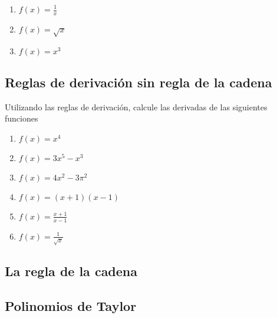 \begin{enumerate}
    \item $f(x) = \frac{1}{x}$
    \item $f(x) = \sqrt{x}$
    \item $f(x) = x^3$
\end{enumerate}

\subsection{Reglas de derivación sin regla de la cadena}

Utilizando las reglas de derivación, calcule las derivadas de las siguientes funciones
\begin{multicols}{2}
    \begin{enumerate}
        \item $f(x) = x^4$
        \item $f(x) = 3x^5 - x^3$
        \item $f(x) = 4x^2 - 3\pi^2$
        \item $f(x) = (x+1)(x-1)$
        \item $f(x) = \frac{x+1}{x-1}$
        \item $f(x) = \frac{1}{\sqrt{x}}$
    \end{enumerate}
\end{multicols}

\subsection{La regla de la cadena}

\subsection{Polinomios de Taylor}